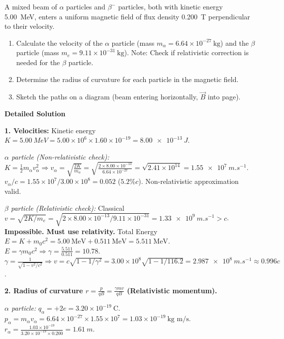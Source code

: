 \documentclass[11pt]{article}
\begin{document}
\begin{exoresolu}
A mixed beam of $\alpha$ particles and $\beta^-$ particles, both with kinetic energy \SI{5.00}{MeV}, enters a uniform magnetic field of flux density \SI{0.200}{T} perpendicular to their velocity.
\begin{enumerate}
\item Calculate the velocity of the $\alpha$ particle (mass $m_\alpha = 6.64 \times 10^{-27}\ \text{kg}$) and the $\beta$ particle (mass $m_e = 9.11 \times 10^{-31}\ \text{kg}$). Note: Check if relativistic correction is needed for the $\beta$ particle.
\item Determine the radius of curvature for each particle in the magnetic field.
\item Sketch the paths on a diagram (beam entering horizontally, $\vec{B}$ into page).
\end{enumerate}
\tcblower
\textbf{Detailed Solution}

\textbf{1. Velocities:}
Kinetic energy $K = \SI{5.00}{MeV} = 5.00 \times 10^6 \times 1.60 \times 10^{-19} = \SI{8.00e-13}{J}$.

\textit{$\alpha$ particle (Non-relativistic check):}
$K = \frac{1}{2} m_\alpha v_\alpha^2 \Rightarrow v_\alpha = \sqrt{\frac{2K}{m_\alpha}} = \sqrt{\frac{2 \times 8.00 \times 10^{-13}}{6.64 \times 10^{-27}}} = \sqrt{2.41 \times 10^{14}} = \SI{1.55e7}{m.s^{-1}}$.
$v_\alpha / c = 1.55 \times 10^7 / 3.00 \times 10^8 = 0.052$ ($5.2\% c$). Non-relativistic approximation valid.

\textit{$\beta$ particle (Relativistic check):}
Classical $v = \sqrt{2K/m_e} = \sqrt{2 \times 8.00 \times 10^{-13} / 9.11 \times 10^{-31}} = \SI{1.33e9}{m.s^{-1}} > c$. \textbf{Impossible. Must use relativity.}
Total Energy $E = K + m_0 c^2 = 5.00\ \text{MeV} + 0.511\ \text{MeV} = 5.511\ \text{MeV}$.
$E = \gamma m_0 c^2 \Rightarrow \gamma = \frac{5.511}{0.511} = 10.78$.
$\gamma = \frac{1}{\sqrt{1 - v^2/c^2}} \Rightarrow v = c \sqrt{1 - 1/\gamma^2} = 3.00 \times 10^8 \sqrt{1 - 1/116.2} = \SI{2.987e8}{m.s^{-1}} \approx 0.996c$.

\textbf{2. Radius of curvature $r = \frac{p}{qB} = \frac{\gamma m v}{qB}$ (Relativistic momentum).}

\textit{$\alpha$ particle:} $q_\alpha = +2e = 3.20 \times 10^{-19}\ \text{C}$.
$p_\alpha = m_\alpha v_\alpha = 6.64 \times 10^{-27} \times 1.55 \times 10^7 = 1.03 \times 10^{-19}\ \text{kg m/s}$.
$r_\alpha = \frac{1.03 \times 10^{-19}}{3.20 \times 10^{-19} \times 0.200} = \SI{1.61}{m}$.


\end{exoresolu}
\end{document}
